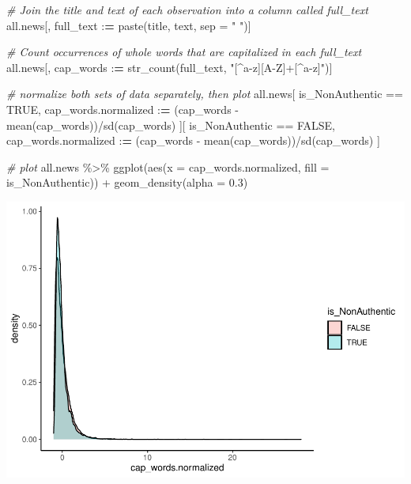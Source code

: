 \documentclass[
]{article}
\newenvironment{Shaded}{\begin{snugshade}}{\end{snugshade}}
\newcommand{\AttributeTok}[1]{\textcolor[rgb]{0.77,0.63,0.00}{#1}}
\newcommand{\CommentTok}[1]{\textcolor[rgb]{0.56,0.35,0.01}{\textit{#1}}}
\newcommand{\ConstantTok}[1]{\textcolor[rgb]{0.00,0.00,0.00}{#1}}
\newcommand{\ErrorTok}[1]{\textcolor[rgb]{0.64,0.00,0.00}{\textbf{#1}}}
\newcommand{\FloatTok}[1]{\textcolor[rgb]{0.00,0.00,0.81}{#1}}
\newcommand{\FunctionTok}[1]{\textcolor[rgb]{0.00,0.00,0.00}{#1}}
\newcommand{\NormalTok}[1]{#1}
\newcommand{\SpecialCharTok}[1]{\textcolor[rgb]{0.00,0.00,0.00}{#1}}
\newcommand{\StringTok}[1]{\textcolor[rgb]{0.31,0.60,0.02}{#1}}
\begin{document}
\begin{Shaded}
\begin{Highlighting}[]
\CommentTok{\# Join the title and text of each observation into a column called full\_text}
\NormalTok{all.news[, full\_text }\SpecialCharTok{:}\ErrorTok{=} \FunctionTok{paste}\NormalTok{(title, text, }\AttributeTok{sep =} \StringTok{" "}\NormalTok{)]}

\CommentTok{\# Count occurrences of whole words that are capitalized in each full\_text}
\NormalTok{all.news[, cap\_words }\SpecialCharTok{:}\ErrorTok{=} \FunctionTok{str\_count}\NormalTok{(full\_text, }\StringTok{"[\^{}a{-}z][A{-}Z]+[\^{}a{-}z]"}\NormalTok{)]}

\CommentTok{\# normalize both sets of data separately, then plot}
\NormalTok{all.news[}
\NormalTok{  is\_NonAuthentic }\SpecialCharTok{==} \ConstantTok{TRUE}\NormalTok{,}
\NormalTok{  cap\_words.normalized }\SpecialCharTok{:}\ErrorTok{=}\NormalTok{ (cap\_words }\SpecialCharTok{{-}} \FunctionTok{mean}\NormalTok{(cap\_words))}\SpecialCharTok{/}\FunctionTok{sd}\NormalTok{(cap\_words)}
\NormalTok{][}
\NormalTok{  is\_NonAuthentic }\SpecialCharTok{==} \ConstantTok{FALSE}\NormalTok{,}
\NormalTok{  cap\_words.normalized }\SpecialCharTok{:}\ErrorTok{=}\NormalTok{ (cap\_words }\SpecialCharTok{{-}} \FunctionTok{mean}\NormalTok{(cap\_words))}\SpecialCharTok{/}\FunctionTok{sd}\NormalTok{(cap\_words)}
\NormalTok{]}

\CommentTok{\# plot}
\NormalTok{all.news }\SpecialCharTok{\%\textgreater{}\%}
  \FunctionTok{ggplot}\NormalTok{(}\FunctionTok{aes}\NormalTok{(}\AttributeTok{x =}\NormalTok{ cap\_words.normalized, }\AttributeTok{fill =}\NormalTok{ is\_NonAuthentic)) }\SpecialCharTok{+}
  \FunctionTok{geom\_density}\NormalTok{(}\AttributeTok{alpha =} \FloatTok{0.3}\NormalTok{)}
\end{Highlighting}
\end{Shaded}

\includegraphics{report_files/figure-latex/visualize_capitalized_word_counts-1.pdf}
\end{document}
